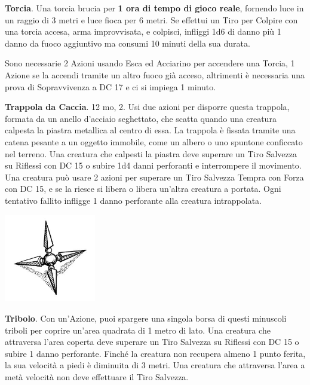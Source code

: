 \begin{multicols}{2}
\textbf{Torcia}\label{Torcia}\hypertarget{Torcia}{}. Una torcia brucia per \textbf{1 ora di tempo di gioco reale}, fornendo luce in un raggio di 3 metri e luce fioca per 6 metri. Se effettui un Tiro per Colpire con una torcia accesa, arma improvvisata, e colpisci, infliggi 1d6 di danno più 1 danno da fuoco aggiuntivo ma consumi 10 minuti della sua durata.

Sono necessarie 2 Azioni usando Esca ed Acciarino per accendere una Torcia, 1 Azione se la accendi tramite un altro fuoco già acceso, altrimenti è necessaria una prova di Sopravvivenza a DC 17 e ci si impiega 1 minuto.

\textbf{Trappola da Caccia}\hypertarget{Trappola da Caccia}{}\label{Trappola da Caccia}. 12 mo, 2. Usi due azioni per disporre questa trappola, formata da un anello d'acciaio seghettato, che scatta quando una creatura calpesta la piastra metallica al centro di essa. La trappola è fissata tramite una catena pesante a un oggetto immobile, come un albero o uno spuntone conficcato nel terreno. Una creatura che calpesti la piastra deve superare un Tiro Salvezza su Riflessi con DC 15 o subire 1d4 danni perforanti e interrompere il movimento. Una creatura può usare 2 azioni per superare un Tiro Salvezza Tempra con Forza con DC 15, e se la riesce si libera o libera un'altra creatura a portata. Ogni tentativo fallito infligge 1 danno perforante alla creatura intrappolata.

\begin{center}
\includegraphics[width=0.3\textwidth]{immagini/tribolo.png}
\end{center}


\textbf{Tribolo}\label{Tribolo}\hypertarget{Tribolo}{}. Con un'Azione, puoi spargere una singola borsa di questi minuscoli triboli per coprire un'area quadrata di 1 metro di lato. Una creatura che attraversa l'area coperta deve superare un Tiro Salvezza su Riflessi con DC 15 o subire 1 danno perforante. Finché la creatura non recupera almeno 1 punto ferita, la sua velocità a piedi è diminuita di 3 metri. Una creatura che attraversa l'area a metà velocità non deve effettuare il Tiro Salvezza.


\end{multicols}
